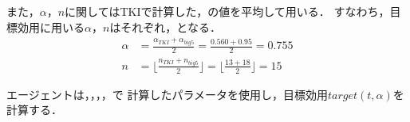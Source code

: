 また，$\alpha$，$n$に関してはTKIで計算した，の値を平均して用いる．
すなわち，目標効用に用いる$\alpha$，$n$はそれぞれ，となる．
\begin{align}
    \alpha &= \frac{\alpha_{TKI} + \alpha_{big5}}{2} = \frac{0.560 + 0.95}{2} = 0.755 \label{eq:target-alpha} \\
    n &= \lfloor \frac{n_{TKI} + n_{big5}}{2} \rfloor = \lfloor \frac{13 + 18}{2} \rfloor = 15 \label{eq:target-n}
\end{align}

エージェントは，，，，で
計算したパラメータを使用し，目標効用$target(t,\alpha)$を計算する．
